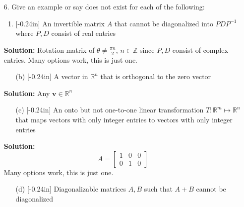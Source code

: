 \documentclass[letterpaper,12pt]{article}
\theoremstyle{definition}
\begin{document}
\newpage
\begin{enumerate}
    \item[6.]  Give an example or say does not exist for each of the following: \begin{enumerate}
        \item\reversemarginpar{}[-0.24in] An invertible matrix $A$ that cannot be diagonalized into $PDP^{-1}$ where $P,D$ consist of real entries
        \end{enumerate}
        \begin{mdframed}
            \textbf{Solution:} Rotation matrix of $\theta \neq \frac{\pi n}{2}$, $n \in \mathbb{Z}$ since $P,D$ consist of complex entries. Many options work, this is just one.
        \end{mdframed}
        \vspace{0.3in}
        \begin{enumerate}
        \item[(b)]\reversemarginpar{}[-0.24in] A vector in $\mathbb{R}^n$ that is orthogonal to the zero vector
        \end{enumerate}
        \begin{mdframed}
            \textbf{Solution:} Any $\mathbf{v} \in \mathbb{R}^n$
        \end{mdframed}
        \vspace{0.5in}
        \begin{enumerate}
        \item[(c)]\reversemarginpar{}[-0.24in] An onto but not one-to-one linear transformation $T: \mathbb{R}^m \mapsto \mathbb{R}^n$ that maps vectors with only integer entries to vectors with only integer entries
        \end{enumerate}
        \begin{mdframed}
            \textbf{Solution:}
            $$A = \begin{bmatrix}
                1 & 0&0 \\ 0 & 1  &0
            \end{bmatrix}$$
            Many options work, this is just one.
        \end{mdframed}
        \begin{enumerate}
        \item[(d)]\reversemarginpar{}[-0.24in] Diagonalizable matrices $A,B$ such that $A+B$ cannot be diagonalized
        \end{enumerate}

\end{enumerate}
\end{document}
